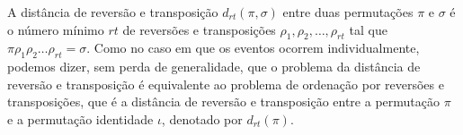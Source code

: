 A distância de reversão e transposição $d_{rt}(\pi, \sigma)$ entre
duas permutações $\pi$ e $\sigma$ é o número mínimo $rt$ de reversões
e transposições $\rho_{1}, \rho_{2}, \ldots, \rho_{rt}$ tal que
$\pi \rho_{1} \rho_{2} \ldots \rho_{rt} = \sigma$. Como no caso em que
os eventos ocorrem individualmente, podemos dizer, sem perda de
generalidade, que o problema da distância de reversão e transposição é
equivalente ao problema de ordenação por reversões e transposições,
que é a distância de reversão e transposição entre a permutação $\pi$ e a
permutação identidade $\iota$, denotado por $d_{rt}(\pi)$.


